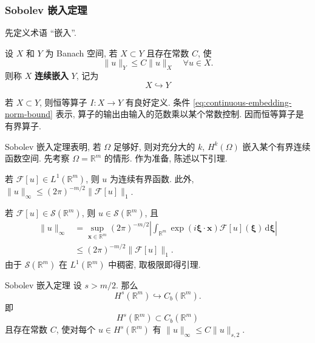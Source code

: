 \subsubsection{Sobolev 嵌入定理}\label{subsec:sobolev-imbedding-theorem}

先定义术语 ``嵌入''.

\begin{Definition}
\label{def:continuous-imbedding}
设 $X$ 和 $Y$ 为 Banach 空间, 若 $X\subset Y$ 且存在常数 $C$, 使
\begin{equation}\label{eq:continuous-embedding-norm-bound}
\|u\|_Y\leq C\|u\|_X\quad\forall u\in X.
\end{equation}
则称 $X$ \textbf{连续嵌入} $Y$, 记为\[X\hookrightarrow Y\]
\end{Definition}

\begin{Remark}
\label{rem:continuous-imbedding-bounded-identity}
若 $X\subset Y$, 则恒等算子 $I:X\to Y$ 有良好定义. 条件 \eqref{eq:continuous-embedding-norm-bound} 表示, 算子的输出由输入的范数乘以某个常数控制. 因而恒等算子是有界算子.
\end{Remark}

Sobolev 嵌入定理表明, 若 $\Omega$ 足够好, 则对充分大的 $k$, $H^k(\Omega)$ 嵌入某个有界连续函数空间. 先考察 $\Omega=\mathbb{R}^m$ 的情形. 作为准备, 陈述以下引理.

\begin{Lemma}
\label{lem:integrable-fourier-transform-continuity}
若 $\mathcal{F}[u]\in L^1(\mathbb{R}^m)$, 则 $u$ 为连续有界函数. 此外, $\|u\|_{\infty}\leq(2\pi)^{-m/2}\|\mathcal{F}[u]\|_1$.
\end{Lemma}

\begin{Proof}
若 $\mathcal{F}[u]\in\mathcal{S}(\mathbb{R}^m)$, 则 $u\in\mathcal{S}(\mathbb{R}^m)$, 且
\begin{equation}\label{eq:integrable-fourier-transform-uniform-bound}
\begin{aligned}
\|u\|_{\infty}&=\sup_{\bm{x}\in\mathbb{R}^m}(2\pi)^{-m/2}\left|\int_{\mathbb{R}^m}\exp(i\bm{\xi}\cdot\bm{x})\mathcal{F}[u](\bm{\xi})\,\mathrm{d}\bm{\xi}\right|\\
&\leq(2\pi)^{-m/2}\|\mathcal{F}[u]\|_1.
\end{aligned}
\end{equation}
由于 $\mathcal{S}(\mathbb{R}^m)$ 在 $L^1(\mathbb{R}^m)$ 中稠密, 取极限即得引理.
\end{Proof}

\begin{Theorem}{Sobolev 嵌入定理}
\label{thm:sobolev-full-space-continuous-embedding}
设 $s>m/2$. 那么\[H^s(\mathbb{R}^m)\hookrightarrow C_b(\mathbb{R}^m).\]即\[H^s(\mathbb{R}^m)\subset C_b(\mathbb{R}^m)\]且存在常数 $C$, 使对每个 $u\in H^s(\mathbb{R}^m)$ 有 $\|u\|_{\infty}\leq C\|u\|_{s,2}$.
\end{Theorem}

